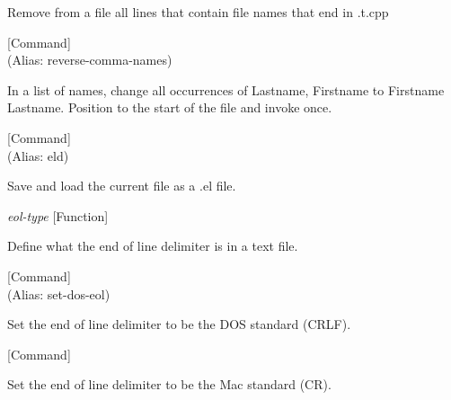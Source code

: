 \begin{doc-string}
Remove from a file all lines that contain file names that end in .t.cpp
\end{doc-string}

\vspace{1em}
\noindent
{}
\usebox{\funcname}
 \hfill [Command]\\%
 (Alias: reverse-comma-names)

\begin{doc-string}
In a list of names, change all occurrences
of Lastname, Firstname to Firstname Lastname.
Position to the start of the file and invoke once.
\end{doc-string}

\vspace{1em}
\noindent
{}
\usebox{\funcname}
 \hfill [Command]\\%
 (Alias: eld)

\begin{doc-string}
Save and load the current file as a .el file.
\end{doc-string}

\vspace{1em}
\noindent
{}
\usebox{\funcname}\emph{eol-type}
 \hfill [Function]

\begin{doc-string}
Define what the end of line delimiter is in a text file.
\end{doc-string}

\vspace{1em}
\noindent
{}
\usebox{\funcname}
 \hfill [Command]\\%
 (Alias: set-dos-eol)

\begin{doc-string}
Set the end of line delimiter to be the DOS standard (CRLF).
\end{doc-string}

\vspace{1em}
\noindent
{}
\usebox{\funcname}
 \hfill [Command]

\begin{doc-string}
Set the end of line delimiter to be the Mac standard (CR).
\end{doc-string}

